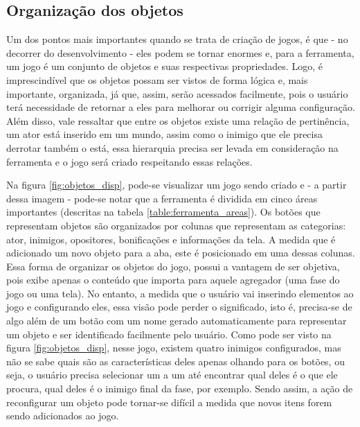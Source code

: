 \documentclass[12pt,oneside,openright,a4paper,english,brazil,sumario=tradicional]{abntex2}
\begin{document}
\subsection{Organização dos objetos}
\label{sec:orga-objetos}
Um dos pontos mais importantes quando se trata de criação de jogos, é que - no decorrer do desenvolvimento - eles podem se tornar enormes e, para a ferramenta, um jogo é um conjunto de objetos e suas respectivas propriedades. Logo, é imprescindível que os objetos possam ser vistos de forma lógica e, mais importante, organizada, já que, assim, serão acessados facilmente, pois o usuário terá necessidade de retornar a eles para melhorar ou corrigir alguma configuração. Além disso, vale ressaltar que entre os objetos existe uma relação de pertinência, um ator está inserido em um mundo, assim como o inimigo que ele precisa derrotar também o está, essa hierarquia precisa ser levada em consideração na ferramenta e o jogo será criado respeitando essas relações.

Na figura \ref{fig:objetos_disp}, pode-se visualizar um jogo sendo criado e - a partir dessa imagem - pode-se notar que a ferramenta é dividida em cinco áreas importantes (descritas na tabela \ref{table:ferramenta_areas}). Os botões que representam objetos são organizados por colunas que representam as categorias: ator, inimigos, opositores, bonificações e informações da tela. A medida que é adicionado um novo objeto para a aba, este é posicionado em uma dessas colunas. Essa forma de organizar os objetos do jogo, possui a vantagem de ser objetiva, pois exibe apenas o conteúdo que importa para aquele agregador (uma fase do jogo ou uma tela). No entanto, a medida que o usuário vai inserindo elementos ao jogo e configurando eles, essa visão pode perder o significado, isto é, precisa-se de algo além de um botão com um nome gerado automaticamente para representar um objeto e ser identificado facilmente pelo usuário. Como pode ser visto na figura \ref{fig:objetos_disp}, nesse jogo, existem quatro inimigos configurados, mas não se sabe quais são as características deles apenas olhando para os botões, ou seja, o usuário precisa selecionar um a um até encontrar qual deles é o que ele procura, qual deles é o inimigo final da fase, por exemplo. Sendo assim, a ação de reconfigurar um objeto pode tornar-se difícil a medida que novos itens forem sendo adicionados ao jogo.
\end{document}
